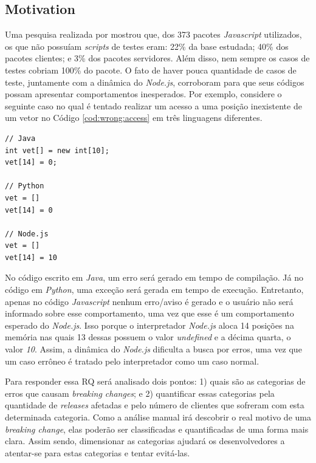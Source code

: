 \subsection{Motivation}
\label{mot:rq2}

Uma pesquisa realizada por  mostrou que, dos 373 pacotes \textit{Javascript} utilizados, os que não possuíam \textit{scripts} de testes eram: 22\% da base estudada; 40\% dos pacotes clientes; e 3\% dos pacotes servidores. Além disso, nem sempre os casos de testes cobriam 100\% do pacote. O fato de haver pouca quantidade de casos de teste, juntamente com a dinâmica do \textit{Node.js}, corroboram para que seus códigos possam apresentar comportamentos inesperados. Por exemplo, considere o seguinte caso no qual é tentado realizar um acesso a uma posição inexistente de um vetor no Código \ref{cod:wrong:access} em três linguagens diferentes.

\begin{lstlisting}[style=javascript, label=cod:wrong:access, caption={Acesso inválido à posição de memória}, numbers=none]
// Java
int vet[] = new int[10];
vet[14] = 0;

// Python
vet = []
vet[14] = 0

// Node.js
vet = []
vet[14] = 10
\end{lstlisting}

No código escrito em \textit{Java}, um erro será gerado em tempo de compilação. Já no código em \textit{Python}, uma exceção será gerada em tempo de execução. Entretanto, apenas no código \textit{Javascript} nenhum erro/aviso é gerado e o usuário não será informado sobre esse comportamento, uma vez que esse é um comportamento esperado do \textit{Node.js}. Isso porque o interpretador \textit{Node.js} aloca 14 posições na memória nas quais 13 dessas possuem o valor \textit{undefined} e a décima quarta, o valor \textit{10}. Assim, a dinâmica do \textit{Node.js} dificulta a busca por erros, uma vez que um caso errôneo é tratado pelo interpretador como um caso normal.


Para responder essa RQ será analisado dois pontos: 1) quais são as categorias de erros que causam \textit{breaking changes}; e 2) quantificar essas categorias pela quantidade de \textit{releases} afetadas e pelo número de clientes que sofreram com esta determinada categoria. Como a análise manual irá descobrir o real motivo de uma \textit{breaking change}, elas poderão ser classificadas e quantificadas de uma forma mais clara. Assim sendo, dimensionar as categorias ajudará os desenvolvedores a atentar-se para estas categorias e tentar evitá-las.

